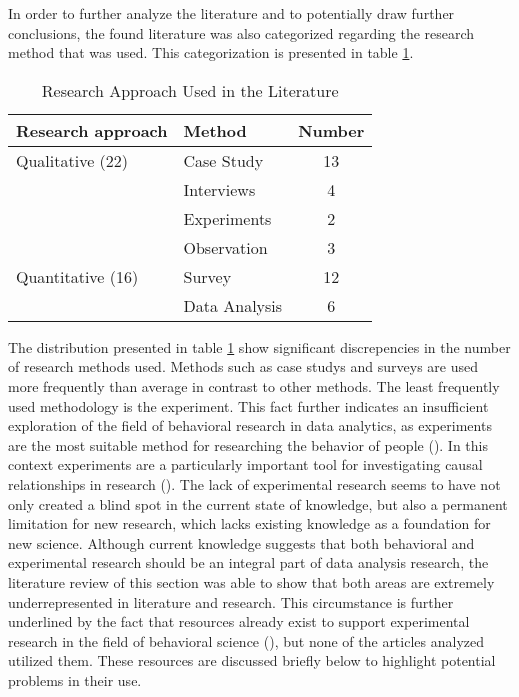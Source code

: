 In order to further analyze the literature and to potentially draw further conclusions, the found literature was also categorized regarding the research method that was used. This categorization is presented in table \ref{researchMethod}. 

\begin{table}[htbp]
    \centering
    \small
    \begin{tabular}{llc}
    \hline
    \multicolumn{1}{l}{Research approach} & \multicolumn{1}{l}{Method} & \multicolumn{1}{l}{Number} \\ \hline
    Qualitative (22)                      & Case Study                 & 13                         \\
                                          & Interviews                 & 4                          \\
                                          & Experiments                & 2                          \\
                                          & Observation                & 3                          \\
    Quantitative (16)                     & Survey                     & 12                         \\
                                          & Data Analysis              & 6                          \\ \hline
    \end{tabular}
    \caption{Research Approach Used in the Literature}
    \label{researchMethod}
    \end{table}

The distribution presented in table \ref{researchMethod} show significant discrepencies in the number of research methods used. Methods such as case studys and surveys are used more frequently than average in contrast to other methods. 
The least frequently used methodology is the experiment. This fact further indicates an insufficient exploration of the field of behavioral research in data analytics, as experiments are the most suitable method for researching the behavior of people (\cite{Gniewosz.2011}). In this context experiments are a particularly important tool for investigating causal relationships in research (\cite{Gniewosz.2011}). 
The lack of experimental research seems to have not only created a blind spot in the current state of knowledge, but also a permanent limitation for new research, which lacks existing knowledge as a foundation for new science. 
Although current knowledge suggests that both behavioral and experimental research should be an integral part of data analysis research, the literature review of this section was able to show that both areas are extremely underrepresented in literature and research. This circumstance is further underlined by the fact that resources already exist to support experimental research in the field of behavioral science (\cite{Columbia.2023}), but none of the articles analyzed utilized them. These resources are discussed briefly below to highlight potential problems in their use.


